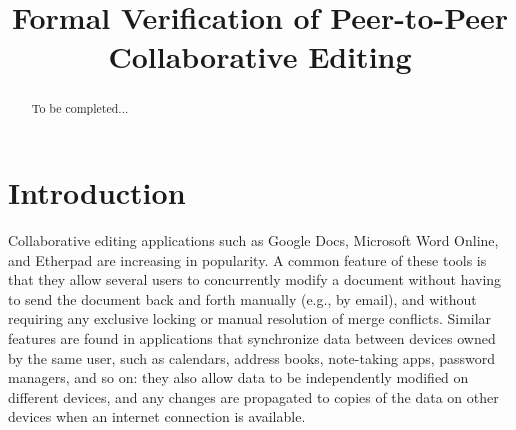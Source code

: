 \documentclass[acmlarge,review,anonymous]{acmart}\settopmatter{printfolios=true}
\begin{document}
\title{Formal Verification of Peer-to-Peer Collaborative Editing}

\maketitle

\begin{abstract}
To be completed...
\end{abstract}


\section{Introduction}
\label{sect.introduction}

Collaborative editing applications such as Google Docs, Microsoft Word Online, and Etherpad are
increasing in popularity. A common feature of these tools is that they allow several users to
concurrently modify a document without having to send the document back and forth manually (e.g., by
email), and without requiring any exclusive locking or manual resolution of merge conflicts. Similar
features are found in applications that synchronize data between devices owned by the same user,
such as calendars, address books, note-taking apps, password managers, and so on: they also allow
data to be independently modified on different devices, and any changes are propagated to copies of
the data on other devices when an internet connection is available.
\end{document}
